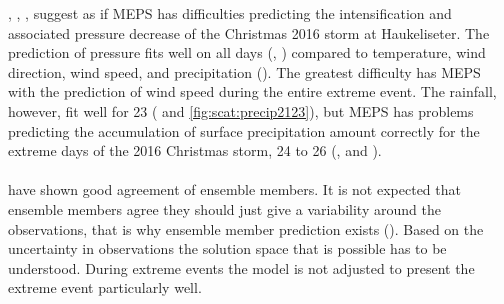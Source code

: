 , , ,  suggest as if MEPS has difficulties predicting the intensification and associated pressure decrease of the Christmas 2016 storm at Haukeliseter. The prediction of pressure fits well on all days (, ) compared to temperature, wind direction, wind speed, and precipitation (). The greatest difficulty has MEPS with the prediction of wind speed during the entire extreme event. The rainfall, however, fit well for \SI{23}{\dec} ( and \ref{fig:scat:precip2123}), but MEPS has problems predicting the accumulation of surface precipitation amount correctly for the extreme days of the 2016 Christmas storm, \num{24} to \SI{26}{\dec} (,  and ).
\\
\\
 have shown good agreement of ensemble members. It is not expected that ensemble members agree they should just give a variability around the observations, that is why ensemble member prediction exists (). Based on the uncertainty in observations the solution space that is possible has to be understood. During extreme events the model is not adjusted to present the extreme event particularly well.





